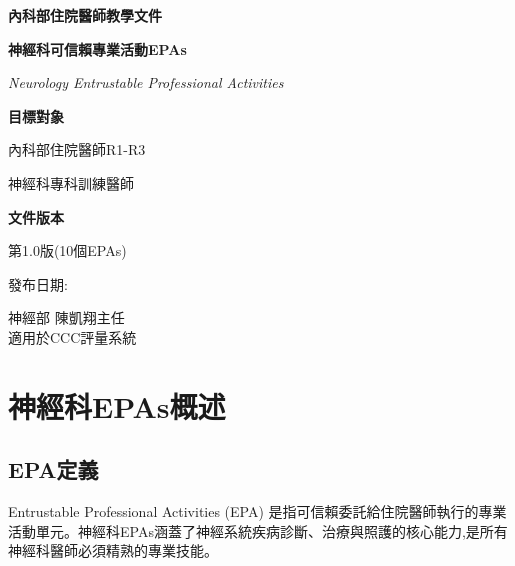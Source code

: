 \documentclass[12pt,a4paper]{article}
\newcommand{\mydate}{\DTMtoday}
\begin{document}
\begin{titlepage}
    \centering
    {\LARGE\textcolor{neuro_blue}{\textbf{內科部住院醫師教學文件}}\par}
    \vspace{1cm}
    {\huge\bfseries 神經科可信賴專業活動EPAs\par}
    \vspace{0.5cm}
    {\Large\textcolor{neuro_silver}{\textit{Neurology Entrustable Professional Activities}}\par}
    \vspace{1cm}
    
    \begin{tcolorbox}[
        colback=neuro_silver!5!white,
        colframe=neuro_silver,
        width=0.8\textwidth,
        arc=10pt,
        boxrule=1pt
    ]
    \centering
    {\large\textbf{目標對象}\par}
    \vspace{0.3cm}
    內科部住院醫師R1-R3\par
    神經科專科訓練醫師\par
    \vspace{0.5cm}
    {\large\textbf{文件版本}\par}
    \vspace{0.3cm}
    第1.0版(10個EPAs)\par
    發布日期:\mydate\par
    \end{tcolorbox}

    \vfill
    
    {\large 神經部 陳凱翔主任 \\
    適用於CCC評量系統\par}
    
    \vspace{0.5cm}
\end{titlepage}

\newpage
\tableofcontents
\newpage

\section{神經科EPAs概述}

\subsection{EPA定義}
Entrustable Professional Activities (EPA) 是指可信賴委託給住院醫師執行的專業活動單元。神經科EPAs涵蓋了神經系統疾病診斷、治療與照護的核心能力,是所有神經科醫師必須精熟的專業技能。
\end{document}
